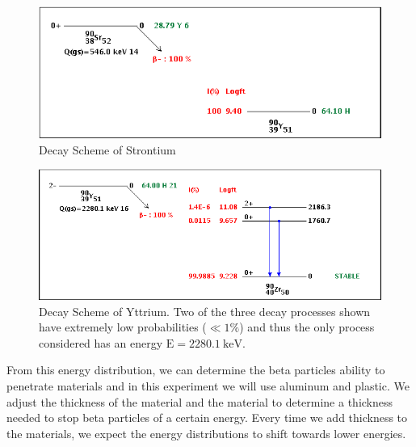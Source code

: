 \begin{figure}
	[tbp] \centering 
	\includegraphics[width=.9
	\textwidth]{Figures/90SrDecay.png} \caption{Decay Scheme of Strontium} \label{fig:Figures_90SrDecay} 
\end{figure}%
\begin{figure}
	[tbp] \centering 
	\includegraphics[width=.9
	\textwidth]{Figures/90YDecay.png} \caption{Decay Scheme of Yttrium.  Two of the three decay processes shown have extremely low probabilities ($\ll 1\%$) and thus the only process considered  has an energy $\text{E}=2280.1~\text{keV}$.} \label{fig:Figures_90YDecay} 
\end{figure}%


From this energy distribution, we can determine the beta particles ability to penetrate materials and in this experiment we will use aluminum and plastic. We adjust the thickness of the material and the material to determine a thickness needed to stop beta particles of a certain energy. Every time we add thickness to the materials, we expect the energy distributions to shift towards lower energies.  


